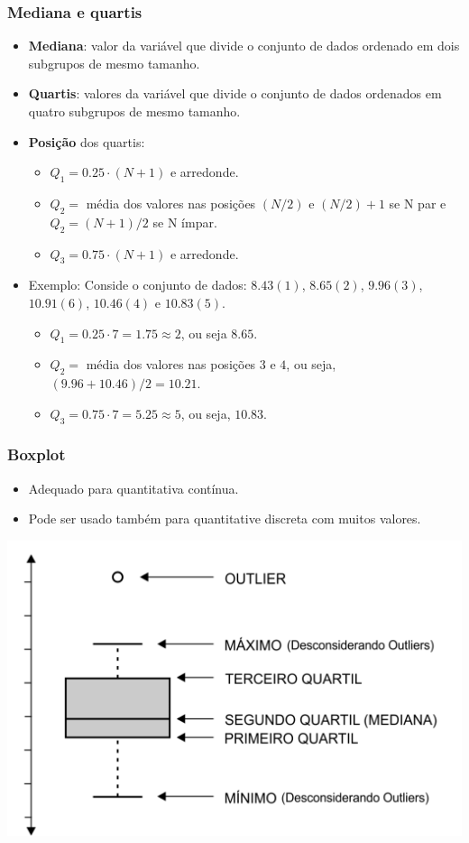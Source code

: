 \documentclass[11pt]{beamer}
\begin{document}
\begin{frame}
\frametitle{Mediana e quartis}

\begin{itemize}
\item
  \textbf{Mediana}: valor da variável que divide o conjunto de dados
  ordenado em dois subgrupos de mesmo tamanho.
\item
  \textbf{Quartis}: valores da variável que divide o conjunto de dados
  ordenados em quatro subgrupos de mesmo tamanho.
\item
  \textbf{Posição} dos quartis:

  \begin{itemize}
  \item
    \(Q_1 = 0.25 \cdot (N+1)\) e arredonde.
  \item
    \(Q_2 =\) média dos valores nas posições \((N/2)\) e \((N/2)+1\) se
    N par e \(Q_2 = (N+1)/2\) se N ímpar.
  \item
    \(Q_3 = 0.75 \cdot (N+1)\) e arredonde.
  \end{itemize}
\item
  Exemplo: Conside o conjunto de dados: \(8.43(1)\), \(8.65(2)\),
  \(9.96(3)\), \(10.91(6)\), \(10.46(4)\) e \(10.83(5)\).

  \begin{itemize}
  \item
    \(Q_1 = 0.25 \cdot 7 = 1.75 \approx 2\), ou seja \(8.65\).
  \item
    \(Q_2 =\) média dos valores nas posições \(3\) e \(4\), ou seja,
    \((9.96 +  10.46 )/2 = 10.21\).
  \item
    \(Q_3 = 0.75 \cdot 7 = 5.25 \approx 5\), ou seja, \(10.83\).
  \end{itemize}
\end{itemize}
\end{frame}

\begin{frame}
\frametitle{Boxplot}

\begin{itemize}
\item
  Adequado para quantitativa contínua.
\item
  Pode ser usado também para quantitative discreta com muitos valores.
\end{itemize}

\begin{center}\includegraphics[width=0.6\linewidth]{figs/boxplot} \end{center}
\end{frame}
\end{document}
